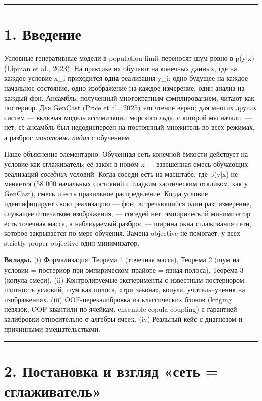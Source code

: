 \documentclass[11pt]{article}
\begin{document}
\bigskip\hrule\bigskip

\section*{1. Введение}

Условные генеративные модели в population-limit переносят шум ровно в p(y|x) (Lipman et al., 2023). На практике их обучают на конечных данных, где на каждое условие x\_i приходится \textbf{одна} реализация y\_i: одно будущее на каждое начальное состояние, одно изображение на каждое измерение, один анализ на каждый фон. Ансамбль, полученный многократным сэмплированием, читают как постериор. Для GenCast (Price et al., 2025) это чтение верно; для многих других систем — включая модель ассимиляции морского льда, с которой мы начали, — нет: её ансамбль был недодисперсен на постоянный множитель во всех режимах, а разброс \emph{монотонно падал} с обучением.

Наше объяснение элементарно. Обученная сеть конечной ёмкости действует на условие как сглаживатель: её закон в новом x — взвешенная смесь обучающих реализаций \emph{соседних} условий. Когда соседи есть на масштабе, где p(y|x) не меняется (58 000 начальных состояний с гладким хаотическим откликом, как у GenCast), смесь и есть правильное распределение. Когда условие идентифицирует свою реализацию — фон, встречающийся один раз; измерение, служащее отпечатком изображения, — соседей нет, эмпирический минимизатор есть точечная масса, а наблюдаемый разброс — ширина окна сглаживания сети, которое закрывается по мере обучения. Замена objective не помогает: у всех strictly proper objective один минимизатор.

\textbf{Вклады.} (i) Формализация: Теорема 1 (точечная масса), Теорема 2 (шум на условии = постериор при эмпирическом прайоре = явная полоса), Теорема 3 (копула смеси). (ii) Контролируемые эксперименты с известным постериором: плотность условий, шум как полоса, «три закона», копула, учитель–ученик на изображениях. (iii) OOF-перекалибровка из классических блоков (kriging невязок, OOF-квантили по ячейкам, ensemble copula coupling) с гарантией калибровки относительно {\symfont σ}-алгебры ячеек. (iv) Реальный кейс с диагнозом и причинными вмешательствами.

\bigskip\hrule\bigskip

\section*{2. Постановка и взгляд «сеть = сглаживатель»}
\end{document}
